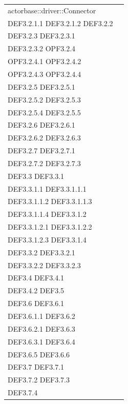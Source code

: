 \documentclass{scalatekids-article}
\begin{document}
\begin{longtable}[H]{|p{11.5cm}|p{5.5cm}|}
actorbase::driver::Connector & \multiLineCell[t]{DEF3.2 DEF3.2.1\\DEF3.2.1.1 DEF3.2.1.2 DEF3.2.2\\DEF3.2.3 DEF3.2.3.1\\DEF3.2.3.2 OPF3.2.4\\OPF3.2.4.1 OPF3.2.4.2\\OPF3.2.4.3 OPF3.2.4.4\\DEF3.2.5 DEF3.2.5.1\\DEF3.2.5.2 DEF3.2.5.3\\DEF3.2.5.4 DEF3.2.5.5\\DEF3.2.6 DEF3.2.6.1\\DEF3.2.6.2 DEF3.2.6.3\\DEF3.2.7 DEF3.2.7.1\\DEF3.2.7.2 DEF3.2.7.3\\DEF3.3 DEF3.3.1\\DEF3.3.1.1 DEF3.3.1.1.1\\DEF3.3.1.1.2 DEF3.3.1.1.3\\DEF3.3.1.1.4 DEF3.3.1.2\\DEF3.3.1.2.1 DEF3.3.1.2.2\\DEF3.3.1.2.3 DEF3.3.1.4\\DEF3.3.2 DEF3.3.2.1\\DEF3.3.2.2 DEF3.3.2.3\\DEF3.4 DEF3.4.1\\DEF3.4.2 DEF3.5\\DEF3.6 DEF3.6.1\\DEF3.6.1.1 DEF3.6.2\\DEF3.6.2.1 DEF3.6.3\\DEF3.6.3.1 DEF3.6.4\\DEF3.6.5 DEF3.6.6\\DEF3.7 DEF3.7.1\\DEF3.7.2 DEF3.7.3\\DEF3.7.4}\\
\hline

\end{longtable}
\end{document}
